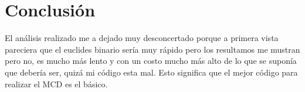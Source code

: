 \documentclass[11pt, conference]{IEEEtran}
\begin{document}
\section{Conclusión}
El análisis realizado me a dejado muy desconcertado porque a primera vista pareciera que el euclides binario sería muy rápido pero los resultamos me mustran pero no, es mucho más lento y con un costo mucho más alto de lo que se suponía que debería ser, quizá mi código esta mal. Esto significa que el mejor código para realizar el MCD es el básico.
\end{document}
